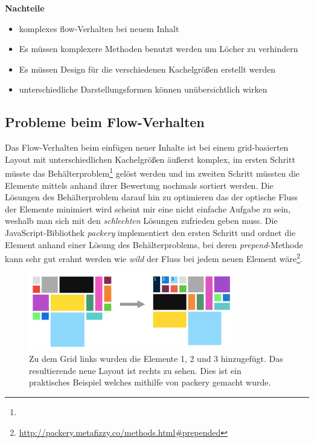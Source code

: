 \documentclass[12pt,twoside]{book}
\begin{document}
\begin{itemize}
  \textbf{Nachteile}\\
  \begin{itemize}
    \item komplexes flow-Verhalten bei neuem Inhalt
    \item Es müssen komplexere Methoden benutzt werden um Löcher zu verhindern
    \item Es müssen Design für die verschiedenen Kachelgrößen erstellt werden
    \item unterschiedliche Darstellungsformen können unübersichtlich wirken
  \end{itemize}

  \subsection*{Probleme beim Flow-Verhalten}
  Das Flow-Verhalten beim einfügen neuer Inhalte ist bei einem grid-basierten Layout mit unterschiedlichen Kachelgrößen äußerst komplex, im ersten Schritt müsste das Behälterproblem\footnote{} gelöst werden und im zweiten Schritt müssten die Elemente mittels anhand ihrer Bewertung nochmals sortiert werden. Die Lösungen des Behälterproblem darauf hin zu optimieren das der optische Fluss der Elemente minimiert wird scheint mir eine nicht einfache Aufgabe zu sein, weshalb man sich mit den \textit{schlechten} Lösungen zufrieden geben muss. Die JavaScript-Bibliothek \textit{packery} implementiert den ersten Schritt und ordnet die Element anhand einer Lösung des Behälterproblems, bei deren \textit{prepend}-Methode kann sehr gut erahnt werden wie \textit{wild} der Fluss bei jedem neuen Element wäre\footnote{\url{http://packery.metafizzy.co/methods.html\#prepended}}.

  \begin{figure}[H]
    \centering
    \includegraphics[width=0.8\textwidth]{images/grid_flow.png}
    \caption{Zu dem Grid links wurden die Elemente 1, 2 und 3 hinzugefügt. Das resultierende neue Layout ist rechts zu sehen. Dies ist ein praktisches Beispiel welches mithilfe von packery gemacht wurde.}
    \label{fig:awesome_image}
  \end{figure}


\end{itemize}
\end{document}
